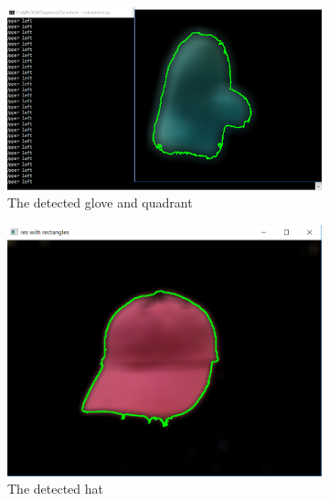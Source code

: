 \documentclass[titlepage, 12pt]{scrartcl}
\begin{document}
    \begin{figure}[ht!]
        \centering
        \begin{subfigure}[b]{0.4\linewidth}
            \includegraphics[width=\textwidth]{figures/glove.png}
            \caption{The detected glove and quadrant}
        \end{subfigure}
        \begin{subfigure}[b]{0.4\linewidth}
            \includegraphics[width=\linewidth]{figures/hat.png}
            \caption{The detected hat}
        \end{subfigure}
        \begin{subfigure}[b]{0.4\linewidth}

\end{subfigure}
\end{figure}
\end{document}
